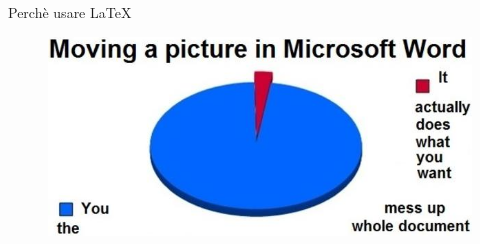\begin{frame}{Perchè usare \LaTeX}
	\begin{figure}[H]
		\centering
		\includegraphics[scale=0.5]{res/images/latexword}
	\end{figure}
\end{frame}